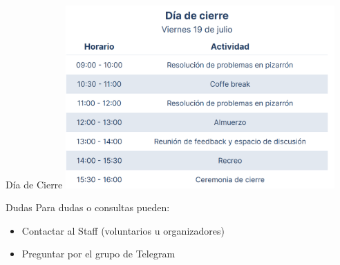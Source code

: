 \documentclass{beamer}
\begin{document}
\begin{frame}{Día de Cierre}
    \centering
    \includegraphics[clip,height=7cm,keepaspectratio]{img/04_cierre.png}
\end{frame}

\begin{frame}{Dudas}
Para dudas o consultas pueden:
        \begin{itemize}
            \item Contactar al Staff (voluntarios u organizadores)
            \item Preguntar por el grupo de Telegram
        \end{itemize}
\end{frame}
\end{document}

